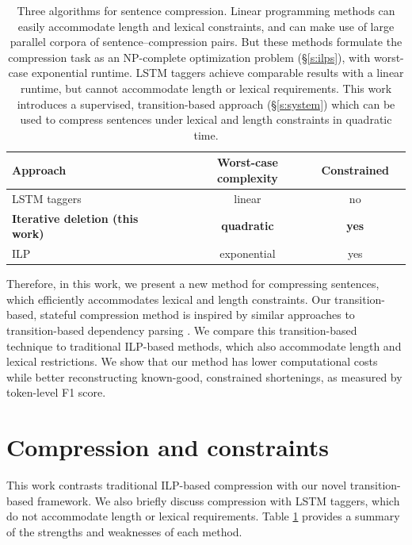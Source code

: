\documentclass[11pt,a4paper]{article}
\begin{document}
\begin{table}[htb!]
\begin{tabular}{lccc}
\textbf{Approach} & \textbf{Worst-case complexity} & \textbf{Constrained}  \\ \hline
LSTM taggers \cite{filippova2015sentence}   & linear              & no         \\   
\textbf{Iterative deletion (this work)}  & \textbf{quadratic}     &      \textbf{yes}   \\
ILP    \cite{filippova2013overcoming,Wang2017CanSH}       &   exponential    & yes      \\
\end{tabular}
\caption{Three algorithms for sentence compression. Linear programming methods \cite{clarke2008global,filippova2013overcoming,Wang2017CanSH} can easily accommodate length and lexical constraints, and can make use of large parallel corpora of sentence--compression pairs. But these methods formulate the compression task as an NP-complete optimization problem (\S\ref{s:ilps}), with worst-case exponential runtime. LSTM taggers \cite{filippova2015sentence} achieve comparable results with a linear runtime, but cannot accommodate length or lexical requirements. This work introduces a supervised, transition-based approach (\S\ref{s:system}) which can be used to compress sentences under lexical and length constraints in quadratic time.} 
\label{t:algos}
\end{table}


Therefore, in this work, we present a new method for compressing sentences, which efficiently accommodates lexical and length constraints. Our transition-based, stateful compression method is inspired by similar approaches to transition-based dependency parsing \cite{nivre2003,D14-1082}. We compare this transition-based technique to traditional ILP-based methods, which also accommodate length and lexical restrictions. We show that our method has lower computational costs while better reconstructing known-good, constrained shortenings, as measured by token-level F1 score. 

\section{Compression and constraints}

This work contrasts traditional ILP-based compression with our novel transition-based framework. We also briefly discuss compression with LSTM taggers, which do not accommodate length or lexical requirements. Table \ref{t:algos} provides a summary of the strengths and weaknesses of each method.
\end{document}
